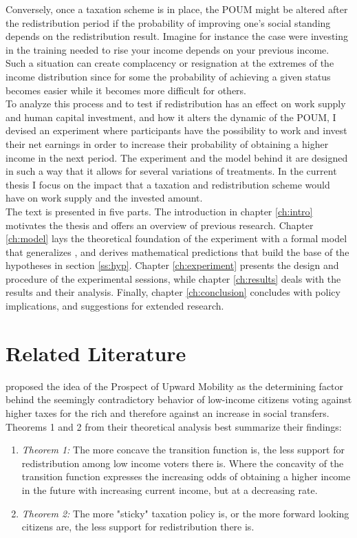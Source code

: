 Conversely, once a taxation scheme is in place, the POUM might be altered after the redistribution period if the probability of improving one's social standing depends on the redistribution result. Imagine for instance the case were investing in the training needed to rise your income depends on your previous income. Such a situation can create complacency or resignation at the extremes of the income distribution since for some the probability of achieving a given status becomes easier while it becomes more difficult for others.\\

To analyze this process and to test if redistribution has an effect on work supply and human capital investment, and how it alters the dynamic of the POUM, I devised an experiment where participants have the possibility to work and invest their net earnings in order to increase their probability of obtaining a higher income in the next period. The experiment and the model behind it are designed in such a way that it allows for several variations of treatments. In the current thesis I focus on the impact that a taxation and redistribution scheme would have on work supply and the invested amount.\\

The text is presented in five parts. The introduction in chapter \ref{ch:intro} motivates the thesis and offers an overview of previous research. Chapter \ref{ch:model} lays the theoretical foundation of the experiment with a formal model that generalizes \cite{koch2017}, and derives mathematical predictions that build the base of the hypotheses in section \ref{ss:hyp}. Chapter \ref{ch:experiment} presents the design and procedure of the experimental sessions, while chapter \ref{ch:results} deals with the results and their analysis. Finally, chapter \ref{ch:conclusion} concludes with policy implications, and suggestions for extended research.\\

\section{Related Literature}

\cite{ok2000} proposed the idea of the Prospect of Upward Mobility as the determining factor behind the seemingly contradictory behavior of low-income citizens voting against higher taxes for the rich and therefore against an increase in social transfers.\\
Theorems 1 and 2 from their theoretical analysis best summarize their findings:
\begin{enumerate}
    \item \textit{Theorem 1:} The more concave the transition function is, the less support for redistribution among low income voters there is. Where the concavity of the transition function expresses the increasing odds of obtaining a higher income in the future with increasing current income, but at a decreasing rate.  
    \item \textit{Theorem 2:} The more "sticky" taxation policy is, or the more forward looking citizens are, the less support for redistribution there is.
\end{enumerate}

